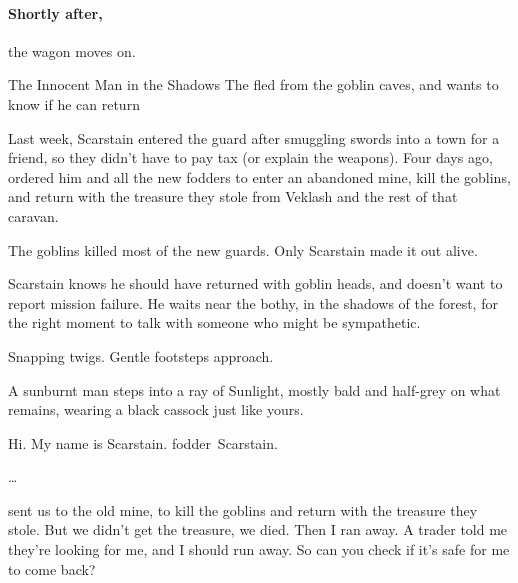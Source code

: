 \begin{multicols}{2}
\paragraph{Shortly after,}
the wagon moves on.

{The Innocent Man in the Shadows}%
{The   fled from the goblin caves, and wants to know if he can return}%

\begin{exampletext}
  Last week, Scarstain entered the \gls{guard} after smuggling swords into a town for a friend, so they didn't have to pay tax (or explain the \glspl{weapon}).
  Four days ago,  ordered him and all the new \glspl{fodder} to enter an abandoned mine, kill the goblins, and return with the treasure they stole from Veklash and the rest of that caravan.

  The goblins killed most of the new \glspl{guard}.
  Only Scarstain made it out alive.
\end{exampletext}

Scarstain knows he should have returned with goblin heads, and doesn't want to report mission failure.
He waits near the \gls{bothy}, in the shadows of the forest, for the right moment to talk with someone who might be sympathetic.

\begin{boxtext}
  Snapping twigs.
  Gentle footsteps approach.
\end{boxtext}


\begin{boxtext}
  A sunburnt man steps into a ray of Sunlight, mostly bald and half-grey on what remains, wearing a black cassock just like yours.

  \begin{speechtext}
    Hi.
    My name is Scarstain.
    \Gls{fodder}~Scarstain.

    \ldots

     sent us to the old mine, to kill the goblins and return with the treasure they stole.
    But we didn't get the treasure, we died.
    Then I ran away.
    A trader told me they're looking for me, and I should run away.
    So can you check if it's safe for me to come back?
  \end{speechtext}


\end{boxtext}
\end{multicols}

